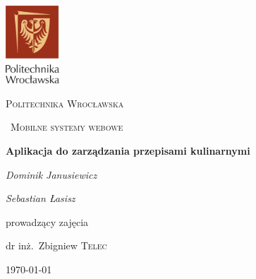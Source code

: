 \documentclass[12pt,a4paper]{report}
\begin{document}
\begin{titlepage}
	\centering
	\includegraphics[width=0.15\textwidth]{logo}\par\vspace{1cm}
	{\scshape\LARGE Politechnika Wrocławska \par}
	\vspace{1cm}
	{\scshape\ Mobilne systemy webowe\par}
	\vspace{0.5cm}
	{\huge\bfseries  Aplikacja do zarządzania przepisami kulinarnymi\par}
	\vspace{2cm}
	{\Large\itshape Dominik Janusiewicz\par}
	{\Large\itshape Sebastian Łasisz \par}
	\vfill
	prowadzący zajęcia\par
	dr inż.~Zbigniew \textsc{Telec}

	\vfill

	{\large \today\par}
\end{titlepage}
\end{document}
